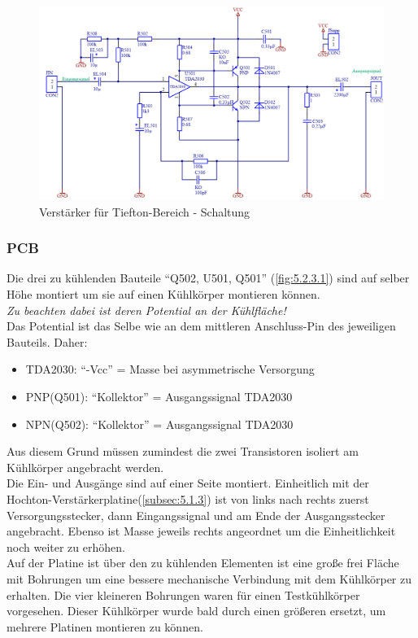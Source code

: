 \begin{figure} [H]
	\centering	
	\includegraphics[width=1\textwidth]{img/Print5/5_TTVerstaerker-Schem.PNG}
	\caption{Verstärker für Tiefton-Bereich - Schaltung}
	\label {fig:5.2.2.1}
\end{figure}

\newpage
\subsubsection{PCB}\label{subsec:5.2.3}
Die drei zu kühlenden Bauteile \enquote{Q502, U501, Q501} (\ref{fig:5.2.3.1}) sind auf selber Höhe montiert um sie auf einen Kühlkörper montieren können.\\
\emph{Zu beachten dabei ist deren Potential an der Kühlfläche!}\\
Das Potential ist das Selbe wie an dem mittleren Anschluss-Pin des jeweiligen Bauteils.
Daher:
\begin{itemize}
	\item TDA2030: \enquote{-Vcc} = Masse bei asymmetrische Versorgung
	\item PNP(Q501): \enquote{Kollektor} = Ausgangssignal TDA2030
	\item NPN(Q502): \enquote{Kollektor} = Ausgangssignal TDA2030
\end{itemize}

Aus diesem Grund müssen zumindest die zwei Transistoren isoliert am Kühlkörper angebracht werden.\\
Die Ein- und Ausgänge sind auf einer Seite montiert. 
Einheitlich mit der Hochton-Verstärkerplatine(\ref{subsec:5.1.3}) ist von links nach rechts zuerst Versorgungsstecker, dann Eingangssignal und am Ende der Ausgangsstecker angebracht.
Ebenso ist Masse jeweils rechts angeordnet um die Einheitlichkeit noch weiter zu erhöhen.\\
Auf der Platine ist über den zu kühlenden Elementen ist eine große frei Fläche mit Bohrungen um eine bessere mechanische Verbindung mit dem Kühlkörper zu erhalten.
Die vier kleineren Bohrungen waren für einen Testkühlkörper vorgesehen. 
Dieser Kühlkörper wurde bald durch einen größeren ersetzt, um mehrere Platinen montieren zu können.

